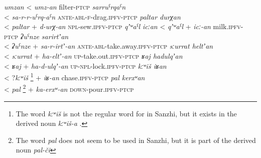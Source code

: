 	\begin{exe}
	\ex	\label{ex:AN-nouns} 
	\begin{xlist}
		\TabPositions{2em,4em}
	\ex \textit{umzan}  <	 \textit{umz-an} filter-\textsc{ptcp}
\ex \textit{sarruˁrqaˁn}  \\
\tab	<	\tab \textit{sa-r-r-uˁrq-aˁn} \textsc{ante-abl-f}-drag.\textsc{ipfv-ptcp}
\ex \textit{paltar durχan}	  \\
\tab	<	\tab \textit{paltar}  + \textit{d-urχ-an} \textsc{npl}-sew.\textsc{ipfv-ptcp}
\ex \textit{qʼʷaˁl icːan}  \tab	 <	\tab   \textit{qʼʷaˁl}  + \textit{icː-an} milk.\textsc{ipfv-ptcp}
\ex \textit{ʡuˁnze sarirtʼan}  \\
\tab	 <	\tab  \textit{ʡuˁnze}  + \textit{sa-r-irtʼ-an} \textsc{ante-abl}-take.away.\textsc{ipfv-ptcp}
\ex \textit{sːurrat heltʼan}  \\
\tab	 <	\tab  \textit{sːurrat}  + \textit{ha-eltʼ-an} \textsc{up}-take.out.\textsc{ipfv-ptcp}
\ex \textit{ʁaj hadulqʼan}  \\
\tab	 <	\tab    \textit{ʁaj}  + \textit{ha-d-ulqʼ-an} \textsc{up-npl}-lock.\textsc{ipfv-ptcp}
\ex \textit{kːʷiš iʁan}  \\
\tab	 <	\tab   ?\textit{kːʷiš} \footnote{The word \textit{kːʷiš} is not the regular word for  in Sanzhi, but it exists in the derived noun \textit{kːʷiš-a} .} + \textit{iʁ-an} chase.\textsc{ipfv-ptcp}
\ex \textit{pal kerxʷan}  \\
\tab	 <	\tab   \textit{pal} \footnote{The word \textit{pal} does not seem to be used in Sanzhi, but it is part of the derived noun \textit{pal-či} } + \textit{ka-erxʷ-an} \textsc{down}-pour.\textsc{ipfv-ptcp}
 	\end{xlist}
\end{exe}


